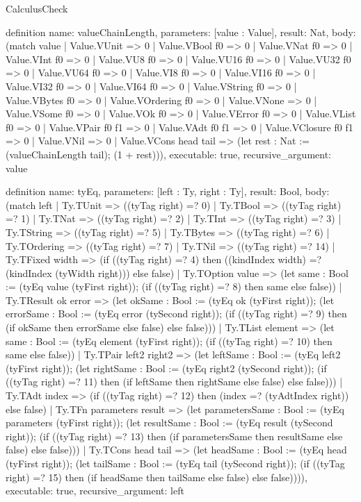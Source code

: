 \begin{lexlean}{CalculusCheck}
\begin{semanticmodule}
definition{
  name: valueChainLength,
  parameters: [value : Value],
  result: Nat,
  body: (match value
    | Value.VUnit => 0
    | Value.VBool f0 => 0
    | Value.VNat f0 => 0
    | Value.VInt f0 => 0
    | Value.VU8 f0 => 0
    | Value.VU16 f0 => 0
    | Value.VU32 f0 => 0
    | Value.VU64 f0 => 0
    | Value.VI8 f0 => 0
    | Value.VI16 f0 => 0
    | Value.VI32 f0 => 0
    | Value.VI64 f0 => 0
    | Value.VString f0 => 0
    | Value.VBytes f0 => 0
    | Value.VOrdering f0 => 0
    | Value.VNone => 0
    | Value.VSome f0 => 0
    | Value.VOk f0 => 0
    | Value.VError f0 => 0
    | Value.VList f0 => 0
    | Value.VPair f0 f1 => 0
    | Value.VAdt f0 f1 => 0
    | Value.VClosure f0 f1 => 0
    | Value.VNil => 0
    | Value.VCons head tail => (let rest : Nat := (valueChainLength tail); (1 + rest))),
  executable: true,
  recursive_argument: value
}

definition{
  name: tyEq,
  parameters: [left : Ty, right : Ty],
  result: Bool,
  body: (match left
    | Ty.TUnit => ((tyTag right) =? 0)
    | Ty.TBool => ((tyTag right) =? 1)
    | Ty.TNat => ((tyTag right) =? 2)
    | Ty.TInt => ((tyTag right) =? 3)
    | Ty.TString => ((tyTag right) =? 5)
    | Ty.TBytes => ((tyTag right) =? 6)
    | Ty.TOrdering => ((tyTag right) =? 7)
    | Ty.TNil => ((tyTag right) =? 14)
    | Ty.TFixed width => (if ((tyTag right) =? 4) then ((kindIndex width) =? (kindIndex (tyWidth right))) else false)
    | Ty.TOption value => (let same : Bool := (tyEq value (tyFirst right)); (if ((tyTag right) =? 8) then same else false))
    | Ty.TResult ok error => (let okSame : Bool := (tyEq ok (tyFirst right)); (let errorSame : Bool := (tyEq error (tySecond right)); (if ((tyTag right) =? 9) then (if okSame then errorSame else false) else false)))
    | Ty.TList element => (let same : Bool := (tyEq element (tyFirst right)); (if ((tyTag right) =? 10) then same else false))
    | Ty.TPair left2 right2 => (let leftSame : Bool := (tyEq left2 (tyFirst right)); (let rightSame : Bool := (tyEq right2 (tySecond right)); (if ((tyTag right) =? 11) then (if leftSame then rightSame else false) else false)))
    | Ty.TAdt index => (if ((tyTag right) =? 12) then (index =? (tyAdtIndex right)) else false)
    | Ty.TFn parameters result => (let parametersSame : Bool := (tyEq parameters (tyFirst right)); (let resultSame : Bool := (tyEq result (tySecond right)); (if ((tyTag right) =? 13) then (if parametersSame then resultSame else false) else false)))
    | Ty.TCons head tail => (let headSame : Bool := (tyEq head (tyFirst right)); (let tailSame : Bool := (tyEq tail (tySecond right)); (if ((tyTag right) =? 15) then (if headSame then tailSame else false) else false)))),
  executable: true,
  recursive_argument: left
}


\end{semanticmodule}
\end{lexlean}
